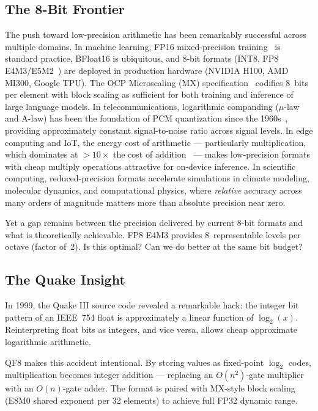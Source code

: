 \documentclass[11pt,letterpaper]{article}
\theoremstyle{definition}
\theoremstyle{remark}
\begin{document}
\subsection{The 8-Bit Frontier}

The push toward low-precision arithmetic has been remarkably successful across
multiple domains.
In machine learning, FP16 mixed-precision training~\cite{micikevicius2018} is standard practice,
BFloat16 is ubiquitous, and 8-bit formats (INT8, FP8 E4M3/E5M2~\cite{micikevicius2022}) are
deployed in production hardware (NVIDIA H100, AMD MI300, Google TPU).
The OCP Microscaling (MX) specification~\cite{rouhani2023} codifies 8~bits per element with
block scaling as sufficient for both training and inference of large language
models.
In telecommunications, logarithmic companding ($\mu$-law and A-law) has been
the foundation of PCM quantization since the 1960s~\cite{smith1957}, providing approximately
constant signal-to-noise ratio across signal levels.
In edge computing and IoT, the energy cost of arithmetic --- particularly
multiplication, which dominates at $>10\times$ the cost of addition~\cite{horowitz2014} ---
makes low-precision formats with cheap multiply operations attractive for
on-device inference.
In scientific computing, reduced-precision formats accelerate simulations in
climate modeling, molecular dynamics, and computational physics, where
\emph{relative} accuracy across many orders of magnitude matters more than
absolute precision near zero.

Yet a gap remains between the precision delivered by current 8-bit formats and
what is theoretically achievable.
FP8 E4M3 provides 8~representable levels per octave (factor of~2).
Is this optimal? Can we do better at the same bit budget?

\subsection{The Quake Insight}

In 1999, the Quake III source code revealed a remarkable hack: the integer
bit pattern of an IEEE~754 float is approximately a linear function of
$\log_2(x)$.
Reinterpreting float bits as integers, and vice versa, allows cheap approximate
logarithmic arithmetic.

QF8 makes this accident intentional.
By storing values as fixed-point $\log_2$ codes, multiplication becomes integer
addition --- replacing an $O(n^2)$-gate multiplier with an $O(n)$-gate adder.
The format is paired with MX-style block scaling (E8M0 shared exponent per 32
elements) to achieve full FP32 dynamic range.
\end{document}
